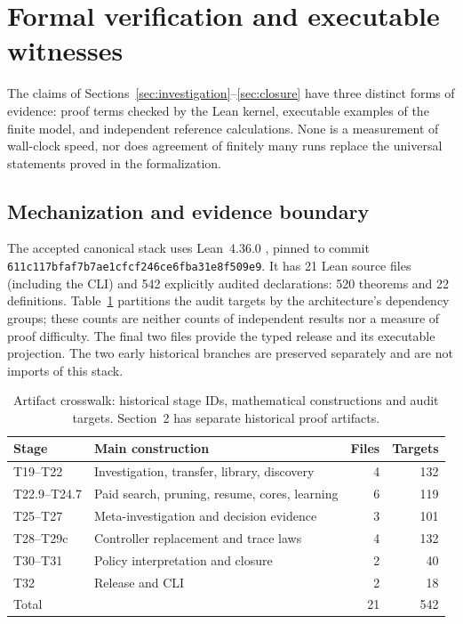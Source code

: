 \section{Formal verification and executable witnesses}\label{sec:verification}
The claims of Sections~\ref{sec:investigation}--\ref{sec:closure} have three distinct forms of evidence: proof terms checked by the Lean kernel, executable examples of the finite model, and independent reference calculations. None is a measurement of wall-clock speed, nor does agreement of finitely many runs replace the universal statements proved in the formalization.

\subsection{Mechanization and evidence boundary}
The accepted canonical stack uses Lean~4.36.0 \cite{lean4}, pinned to commit\\
\texttt{611c117bfaf7b7ae1cfcf246ce6fba31e8f509e9}. It has 21 Lean source files (including the CLI) and 542 explicitly audited declarations: 520 theorems and 22 definitions. Table~\ref{tab:formal-audit} partitions the audit targets by the architecture's dependency groups; these counts are neither counts of independent results nor a measure of proof difficulty. The final two files provide the typed release and its executable projection. The two early historical branches are preserved separately and are not imports of this stack.

\begin{table}[htbp]
\centering\small
\caption{Artifact crosswalk: historical stage IDs, mathematical constructions and audit targets. Section~2 has separate historical proof artifacts.}\label{tab:formal-audit}
\begin{tabularx}{\linewidth}{@{}lXrr@{}}\toprule
Stage & Main construction & Files & Targets\\\midrule
T19--T22 & Investigation, transfer, library, discovery & 4 & 132\\
T22.9--T24.7 & Paid search, pruning, resume, cores, learning & 6 & 119\\
T25--T27 & Meta-investigation and decision evidence & 3 & 101\\
T28--T29c & Controller replacement and trace laws & 4 & 132\\
T30--T31 & Policy interpretation and closure & 2 & 40\\
T32 & Release and CLI & 2 & 18\\\midrule
Total & & 21 & 542\\\bottomrule
\end{tabularx}
\end{table}

